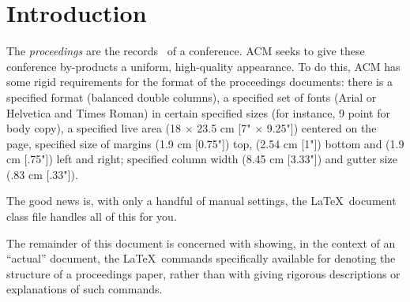\documentclass{sig-alternate-per}
\begin{document}
    \section{Introduction}\label{sec:introduction}
    The \textit{proceedings} are the records~\cite{Lamport:LaTeX} of a conference.
    ACM seeks to give these conference by-products a uniform,
    high-quality appearance.  To do this, ACM has some rigid
    requirements for the format of the proceedings documents: there
    is a specified format (balanced  double columns), a specified
    set of fonts (Arial or Helvetica and Times Roman) in
    certain specified sizes (for instance, 9 point for body copy),
    a specified live area (18 $\times$ 23.5 cm [7" $\times$ 9.25"]) centered on
    the page, specified size of margins (1.9 cm [0.75"]) top, (2.54 cm [1"]) bottom
    and (1.9 cm [.75"]) left and right; specified column width
    (8.45 cm [3.33"]) and gutter size (.83 cm [.33"]).

    The good news is, with only a handful of manual
    settings, the \LaTeX\ document
    class file handles all of this for you.

    The remainder of this document is concerned with showing, in
    the context of an ``actual'' document, the \LaTeX\ commands
    specifically available for denoting the structure of a
    proceedings paper, rather than with giving rigorous descriptions
    or explanations of such commands.
%    
%
    
    
\end{document}
